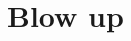 \documentclass[12pt]{article}
\theoremstyle{definition}
\theoremstyle{plain}
\newcommand{\dif}{\mathrm{d}} %
\begin{document}






\section{Blow up}

\end{document}
